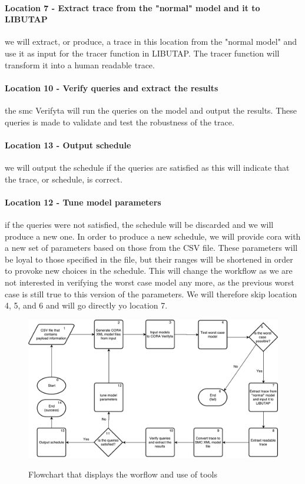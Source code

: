 \paragraph{Location 7 - Extract trace from the "normal" model and it to LIBUTAP}  
we will extract, or produce, a trace in this location from the "normal model" and use it as input for the tracer function in LIBUTAP. The tracer function will transform it into a human readable trace.


\paragraph{Location 10 - Verify queries and extract the results} the \gls{smc} Verifyta will run the queries on the model and output the results. These queries is made to validate and test the robustness of the trace.

\paragraph{Location 13 - Output schedule} we will output the schedule if the queries are satisfied as this will indicate that the trace, or schedule, is correct.

\paragraph{Location 12 - Tune model parameters} if the queries were not satisfied, the schedule will be discarded and we will produce a new one. In order to produce a new schedule, we will provide \gls{cora} with a new set of parameters based on those from the CSV file. These parameters will be loyal to those specified in the file, but their ranges will be shortened in order to provoke new choices in the schedule. This will change the workflow as we are not interested in verifying the worst case model any more, as the previous worst case is still true to this version of the parameters. We will therefore skip location 4, 5, and 6 and will go directly yo location 7.

\begin{figure}
	\includegraphics[width=\textwidth]{graphics/tool_chain.pdf}
	\label{fig:tool_chain}
	\caption{Flowchart that displays the worflow and use of tools}
\end{figure}
